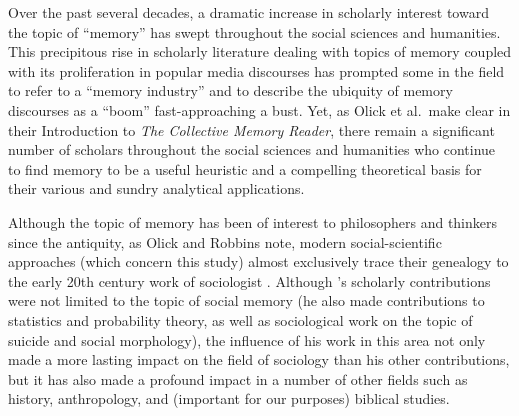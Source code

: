 
Over the past several decades, a dramatic increase in scholarly interest toward the topic of ``memory'' has swept throughout the social sciences and humanities. This precipitous rise in scholarly literature dealing with topics of memory coupled with its proliferation in popular media discourses has prompted some in the field to refer to a ``memory industry'' and to describe the ubiquity of memory discourses as a ``boom'' fast-approaching a bust.\autocites{rosenfeld_jmh2009}{winter2006}{berliner_aq2005}{confino_ahr1997} Yet, as Olick et al.~make clear in their Introduction to \emph{The Collective Memory Reader}, there remain a significant number of scholars throughout the social sciences and humanities who continue to find memory to be a useful heuristic and a compelling theoretical basis for their various and sundry analytical applications.\autocite[3--6]{olick_olick-etal2011}  

Although the topic of memory has been of interest to philosophers and thinkers since the antiquity,\autocite{carruthers_radstone-schwarz2011} as Olick and Robbins note, modern social-scientific approaches (which concern this study) almost exclusively trace their genealogy to the early 20th century work of sociologist \Halbwachs.\autocites[106]{olick-robbins_ars1998}[It should be noted, however, that \halbwachs was not the first or only person to do work on memory or the impact of social structures on memory. See][8--36]{olick_olick-etal2011} Although \halbwachs's scholarly contributions were not limited to the topic of social memory (he also made contributions to statistics and probability theory, as well as sociological work on the topic of suicide and social morphology), the influence of his work in this area not only made a more lasting impact on the field of sociology than his other contributions, but it has also made a profound impact in a number of other fields such as history, anthropology, and (important for our purposes) biblical studies.\autocite[13--20]{coser_halbwachs1992} 